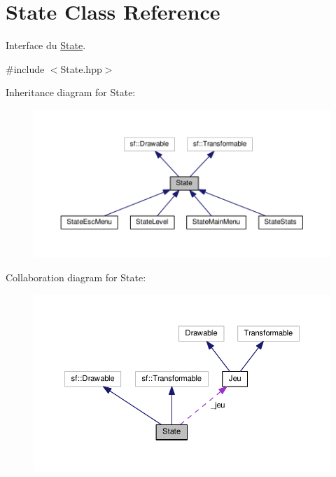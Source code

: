 \hypertarget{class_state}{\section{State Class Reference}
\label{class_state}
}


Interface du \hyperlink{class_state}{State}.  




{\ttfamily \#include $<$State.\+hpp$>$}



Inheritance diagram for State\+:
\nopagebreak
\begin{figure}[H]
\begin{center}
\leavevmode
\includegraphics[width=350pt]{class_state__inherit__graph}
\end{center}
\end{figure}


Collaboration diagram for State\+:
\nopagebreak
\begin{figure}[H]
\begin{center}
\leavevmode
\includegraphics[width=350pt]{class_state__coll__graph}
\end{center}
\end{figure}
